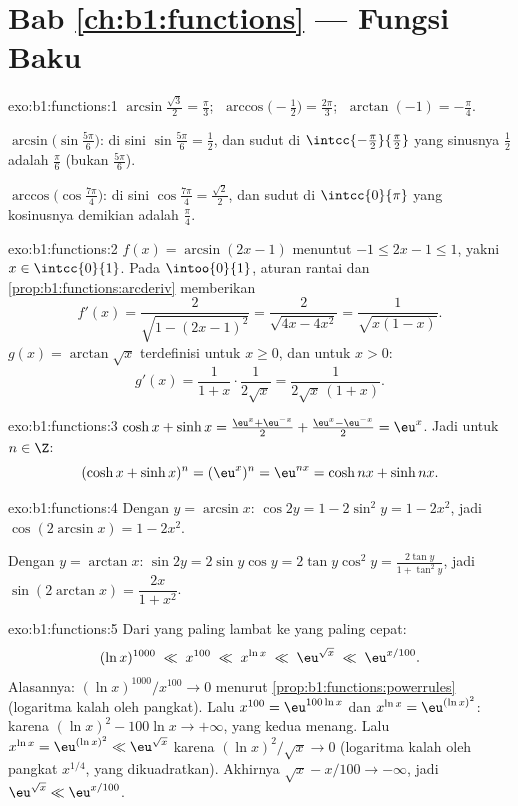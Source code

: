 \section*{Bab \ref{ch:b1:functions} --- Fungsi Baku}

\begin{solution}{exo:b1:functions:1}
$\arcsin\frac{\sqrt 3}{2} = \frac\pi3$;
$\;\arccos\bigl(-\frac12\bigr) = \frac{2\pi}{3}$;
$\;\arctan(-1) = -\frac\pi4$.

$\arcsin\bigl(\sin\frac{5\pi}{6}\bigr)$: di sini $\sin\frac{5\pi}{6} =
\frac12$, dan sudut di $\intcc{-\frac\pi2}{\frac\pi2}$ yang sinusnya
$\frac12$ adalah $\frac\pi6$ (bukan $\frac{5\pi}{6}$).

$\arccos\bigl(\cos\frac{7\pi}{4}\bigr)$: di sini $\cos\frac{7\pi}{4} =
\frac{\sqrt 2}{2}$, dan sudut di $\intcc{0}{\pi}$ yang kosinusnya demikian
adalah $\frac\pi4$.
\end{solution}

\begin{solution}{exo:b1:functions:2}
$f(x) = \arcsin(2x - 1)$ menuntut $-1 \leq 2x - 1 \leq 1$, yakni $x
\in \intcc{0}{1}$. Pada $\intoo{0}{1}$, aturan rantai dan
\cref{prop:b1:functions:arcderiv} memberikan
\[
f'(x) = \frac{2}{\sqrt{1 - (2x-1)^2}} = \frac{2}{\sqrt{4x - 4x^2}}
= \frac{1}{\sqrt{x(1 - x)}} .
\]
$g(x) = \arctan\sqrt x$ terdefinisi untuk $x \geq 0$, dan untuk $x > 0$:
\[
g'(x) = \frac{1}{1 + x} \cdot \frac{1}{2\sqrt x}
= \frac{1}{2\sqrt x\,(1 + x)} .
\]
\end{solution}

\begin{solution}{exo:b1:functions:3}
$\cosh x + \sinh x = \frac{\eu^x + \eu^{-x}}{2} + \frac{\eu^x -
\eu^{-x}}{2} = \eu^x$. Jadi untuk $n \in \Z$:
\[
(\cosh x + \sinh x)^n = (\eu^x)^n = \eu^{nx}
= \cosh nx + \sinh nx .
\]
\end{solution}

\begin{solution}{exo:b1:functions:4}
Dengan $y = \arcsin x$: $\cos 2y = 1 - 2\sin^2 y = 1 - 2x^2$, jadi
$\cos(2\arcsin x) = 1 - 2x^2$.

Dengan $y = \arctan x$: $\sin 2y = 2 \sin y \cos y = 2 \tan y \cos^2 y =
\frac{2\tan y}{1 + \tan^2 y}$, jadi $\sin(2\arctan x) =
\dfrac{2x}{1 + x^2}$.
\end{solution}

\begin{solution}{exo:b1:functions:5}
Dari yang paling lambat ke yang paling cepat:
\[
(\ln x)^{1000} \;\ll\; x^{100} \;\ll\; x^{\ln x} \;\ll\;
\eu^{\sqrt x} \;\ll\; \eu^{x/100} .
\]
Alasannya: $(\ln x)^{1000}/x^{100} \to 0$ menurut
\cref{prop:b1:functions:powerrules} (logaritma kalah oleh pangkat).
Lalu $x^{100} = \eu^{100\ln x}$ dan $x^{\ln x} = \eu^{(\ln x)^2}$: karena
$(\ln x)^2 - 100\ln x \to +\infty$, yang kedua menang. Lalu $x^{\ln x} =
\eu^{(\ln x)^2} \ll \eu^{\sqrt x}$ karena $(\ln x)^2/\sqrt x \to 0$
(logaritma kalah oleh pangkat $x^{1/4}$, yang dikuadratkan). Akhirnya $\sqrt x - x/100
\to -\infty$, jadi $\eu^{\sqrt x} \ll \eu^{x/100}$.
\end{solution}

